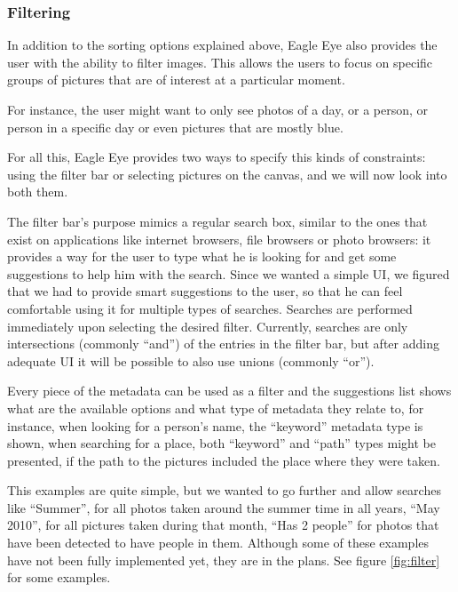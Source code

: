 \subsubsection{Filtering} %
\label{ss:filtering}

In addition to the sorting options explained above, Eagle Eye also provides the user with the ability to filter images. This allows the users to focus on specific groups of pictures that are of interest at a particular moment.

For instance, the user might want to only see photos of a day, or a person, or person in a specific day or even pictures that are mostly blue.

For all this, Eagle Eye provides two ways to specify this kinds of constraints: using the filter bar or selecting pictures on the canvas, and we will now look into both them.

The filter bar's purpose mimics a regular search box, similar to the ones that exist on applications like internet browsers, file browsers or photo browsers: it provides a way for the user to type what he is looking for and get some suggestions to help him with the search. Since we wanted a simple \ac{UI}, we figured that we had to provide smart suggestions to the user, so that he can feel comfortable using it for multiple types of searches. Searches are performed immediately upon selecting the desired filter. Currently, searches are only intersections (commonly ``and'') of the entries in the filter bar, but after adding adequate \ac{UI} it will be possible to also use unions (commonly ``or'').

Every piece of the metadata can be used as a filter and the suggestions list shows what are the available options and what type of metadata they relate to, for instance, when looking for a person's name, the ``keyword'' metadata type is shown, when searching for a place, both ``keyword'' and ``path'' types might be presented, if the path to the pictures included the place where they were taken.

This examples are quite simple, but we wanted to go further and allow searches like ``Summer'', for all photos taken around the summer time in all years, ``May 2010'', for all pictures taken during that month, ``Has 2 people'' for photos that have been detected to have people in them. Although some of these examples have not been fully implemented yet, they are in the plans. See figure \ref{fig:filter} for some examples.

